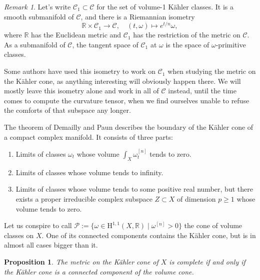 \documentclass[11pt,a4paper]{amsart}
\newtheorem{prop}[theo]{Proposition}
\theoremstyle{definition}
\theoremstyle{remark}
\newtheorem*{rema}{Remark}
\newcommand{\RR}{\mathbb{R}}
\def\coho#1{\mathrm{H}^{#1}}
\def\kf{\omega}
\def\^#1{^{[#1]}}
\def\KC{C}
\def\RKC{\mathcal{\KC}}
\begin{document}
\begin{rema}
Let's write $\RKC_1 \subset \RKC$ for the set of volume-1 K\"{a}hler classes. It is a
smooth submanifold of $\RKC$, and there is a Riemannian isometry
$$
\RR \times \RKC_1 \to \RKC,
\quad
(t, \kf) \mapsto e^{t/n} \kf,
$$
where $\RR$ has the Euclidean metric and $\RKC_1$ has the restriction of the metric
on $\RKC$. As a submanifold of $\RKC$, the tangent space of $\RKC_1$ at $\kf$ is the
space of $\kf$-primitive classes.

Some authors have used this isometry to work on $\RKC_1$ when studying the metric
on the K\"{a}hler cone, as anything interesting will obviously happen there. We will
mostly leave this isometry alone and work in all of $\RKC$ instead, until the time
comes to compute the curvature tensor, when we find ourselves unable to refuse
the comforts of that subspace any longer.
\end{rema}



The theorem of Demailly and Paun describes the boundary of the
K\"{a}hler cone of a compact complex manifold. It consists of three
parts:
\begin{enumerate}
\item Limits of classes $\kf_t$ whose volume $\int_X \kf_t\^n$
tends to zero.
\item Limits of classes whose volume tends to infinity.
\item Limits of classes whose volume tends to some positive real
number, but there exists a proper irreducible complex subspace $Z
\subset X$ of dimension $p \geq 1$ whose volume tends to zero.
\end{enumerate}

Let us conspire to call $\mathcal{P} := \{\kf \in \coho{1,1}(X,\RR) \mid \kf\^n
> 0\}$ the cone of volume classes on $X$. One of its connected components
contains the K\"{a}hler cone, but is in almost all cases bigger than it.

\begin{prop}
\label{prop:fofo}
The metric on the K\"{a}hler cone of $X$ is complete if and only if the
K\"{a}hler cone is a connected component of the volume cone.
\end{prop}
\end{document}
